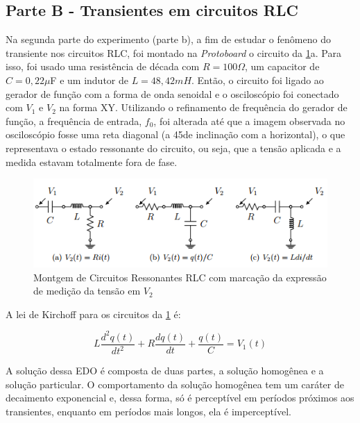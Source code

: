 \documentclass[11pt,a4paper]{article}
\begin{document}
    \subsection{Parte B - Transientes em circuitos RLC}
    
    Na segunda parte do experimento (parte b), a fim de estudar o fenômeno do transiente nos circuitos RLC, foi montado na \textit{Protoboard} o circuito da \cref{CircResson}a. Para isso, foi usado uma resistência de década com $R=100\Omega$, um capacitor de $C=0,22\mu$F e um indutor de $L=48,42mH$. Então, o circuito foi ligado ao gerador de função com a forma de onda senoidal e o osciloscópio foi conectado com $V_1$ e $V_2$ na forma XY. Utilizando o refinamento de frequência do gerador de função, a frequência de entrada, \textit{$f_0$}, foi alterada até que a imagem observada no osciloscópio fosse uma reta diagonal (a 45\textdegree  de inclinação com a horizontal), o que  representava o estado ressonante do circuito, ou seja, que a tensão aplicada e a medida estavam totalmente fora de fase.
    
    
        \begin{figure}[!htb]
        \centering
        \includegraphics[scale=0.7]{CircResson.png}
        \caption{Montgem de Circuitos Ressonantes RLC com marcação da expressão de medição da tensão em $V_2$}
        \label{CircResson}
        \end{figure}
    
    A lei de Kirchoff para os circuitos da \cref{CircResson} é:
    
    \begin{equation}
        L\dfrac{d^{2}q\left(t\right)}{dt^{2}}+R\dfrac{dq\left(t\right)}{dt}+\dfrac{q\left(t\right)}{C}=V_{1}\left(t\right)
    \label{eq:4}
    \end{equation}
    
    A solução dessa EDO é composta de duas partes, a solução homogênea e a solução particular. O comportamento da solução homogênea tem um caráter de decaimento exponencial e, dessa forma, só é perceptível em períodos próximos aos transientes, enquanto em períodos mais longos, ela é imperceptível.
    
\end{document}
